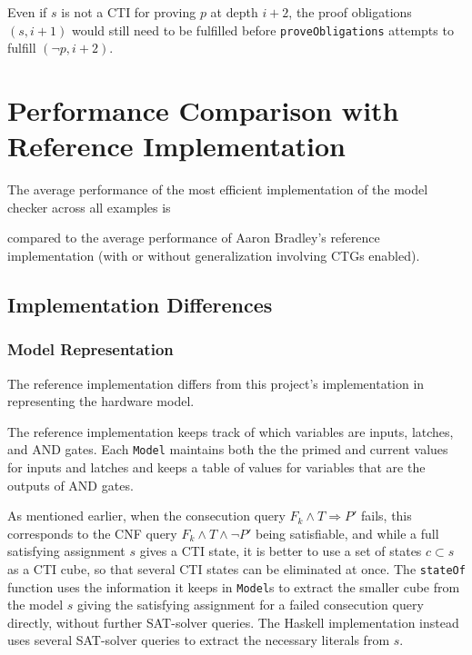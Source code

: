 \documentclass[12pt,a4paper,twoside,openright]{report}
\begin{document}
Even if $s$ is not a CTI for proving $p$ at depth $i + 2$, the proof obligations $(s, i+1)$ would still need to
be fulfilled before \verb,proveObligations, attempts to fulfill $(\neg p, i + 2)$.

\section{Performance Comparison with Reference Implementation}

The average performance of the most efficient implementation of the model checker across all examples is

compared to the average performance of Aaron Bradley's reference implementation (with or without generalization
involving CTGs enabled).

\subsection{Implementation Differences}

\subsubsection{Model Representation}
The reference implementation differs from this project's implementation in representing the hardware model.

The reference implementation keeps track of which variables are inputs, latches, and AND gates.
Each \verb,Model, maintains both the the primed and current values for inputs and latches and keeps a
table of values for variables that are the outputs of AND gates.


As mentioned earlier, when the consecution query $F_k \wedge T \Rightarrow P'$ fails, this corresponds
to the CNF query $F_k \wedge T \wedge \neg P'$ being satisfiable, and while a full satisfying assignment
$s$ gives a CTI state, it is better to use a set of states $c \subset s$ as a CTI cube, so that several
CTI states can be eliminated at once.
The \verb,stateOf, function uses the information it keeps in \verb,Model,s to extract the smaller
cube from the model $s$ giving the satisfying assignment for a failed consecution query directly,
without further SAT-solver queries.
The Haskell implementation instead uses several SAT-solver queries to extract the necessary literals
from $s$.
\end{document}
